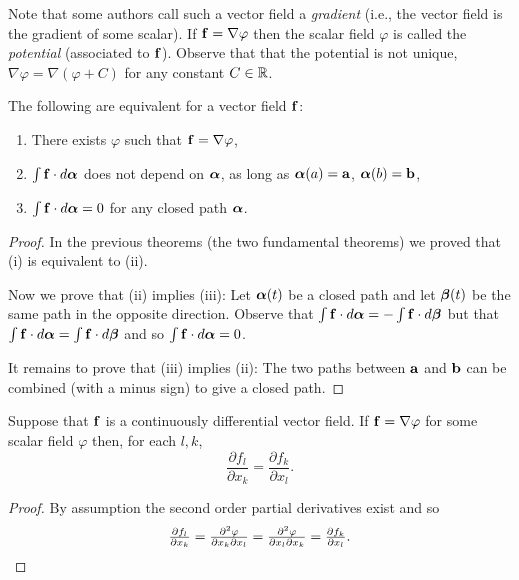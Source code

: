 Note that some authors call such a vector field a \emph{gradient} (i.e., the vector field is the gradient of some scalar).
If \(\ff = \nabla \varphi\) then the scalar field \(\varphi\) is called the \emph{potential} (associated to \(\ff\)).
Observe that that the potential is not unique,
\(\nabla \varphi = \nabla(\varphi + C)\) for any constant \(C \in \bR\).


\begin{theorem}
    The following are equivalent for a vector field \(\ff\):
    \begin{enumerate}[label=\textnormal{(\roman*)}]
        \item There exists \(\varphi\) such that \(\ff = \nabla \varphi\),
        \item \(\int \ff \cdot d\aalpha\) does not depend on \(\aalpha\), as long as \(\aalpha(a)=\aa\), \(\aalpha(b)=\bb\),
        \item \(\int \ff \cdot d\aalpha = 0\) for any closed path \(\aalpha\).
    \end{enumerate}
\end{theorem}

\begin{proof}
    In the previous theorems (the two fundamental theorems) we proved that (i) is equivalent to (ii).

    Now we prove that (ii) implies (iii):
    Let \(\aalpha(t)\) be a closed path and let \(\bbeta(t)\) be the same path in the opposite direction. Observe that \(\int \ff \cdot d\aalpha = - \int \ff \cdot d \bbeta\) but that \(\int \ff \cdot d \aalpha = \int \ff \cdot d \bbeta\) and so \(\int \ff \cdot d \aalpha = 0\).

    It remains to prove that (iii) implies (ii): The two paths between \(\aa\) and \(\bb\) can be combined (with a minus sign) to give a closed path.
\end{proof}

\begin{theorem}%
    \label{thm:mixed-partials}
    Suppose that \(\ff\) is a continuously differential vector field.
    If \(\ff = \nabla \varphi\) for some scalar field \(\varphi\) then, for each \(l,k\),
    \[
        \frac{\partial f_l}{\partial x_k} = \frac{\partial f_k}{\partial x_l}.
    \]
\end{theorem}

\begin{proof}
    By assumption the second order partial derivatives exist and so
    \[
        \tfrac{\partial f_l}{\partial x_k}
        = \tfrac{\partial^2 \varphi}{\partial x_k \partial x_l}
        = \tfrac{\partial^2 \varphi}{\partial x_l \partial x_k}
        = \tfrac{\partial f_k}{\partial x_l}. \qedhere
    \]
\end{proof}


